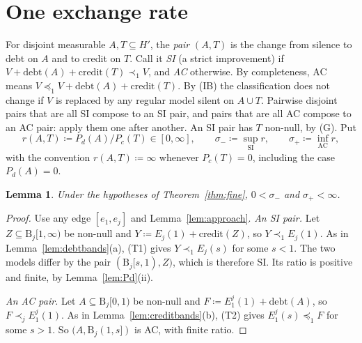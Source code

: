 \documentclass[11pt]{article}
\newtheorem{lemma}[theorem]{Lemma}
\theoremstyle{definition}\newtheorem{definition}[theorem]{Definition}
\theoremstyle{remark}\newtheorem{remark}[theorem]{Remark}
\newcommand{\debt}{\mathrm{debt}}
\newcommand{\cred}{\mathrm{credit}}
\newcommand{\Band}{\mathrm{B}}
\begin{document}
\section{One exchange rate}\label{sec:rate}

For disjoint measurable $A,T\subseteq H'$, the \emph{pair} $(A,T)$ is the
change from silence to debt on $A$ and to credit on $T$. Call it \emph{SI}
(a strict improvement) if $V+\debt(A)+\cred(T)\prec_1V$, and \emph{AC}
otherwise. By completeness, AC means $V\preceq_1V+\debt(A)+\cred(T)$. By
(IB) the classification does not change if $V$ is replaced by any regular
model silent on $A\cup T$. Pairwise disjoint pairs that are all SI compose to
an SI pair, and pairs that are all AC compose to an AC pair: apply them one
after another. An SI pair has $T$ non-null, by (G). Put
\[
 r(A,T)\coloneqq P_d(A)/P_c(T)\in[0,\infty],\qquad
 \sigma_-\coloneqq\sup_{\text{SI}}r,\qquad\sigma_+\coloneqq\inf_{\text{AC}}r,
\]
with the convention $r(A,T)\coloneqq\infty$ whenever $P_c(T)=0$, including
the case $P_d(A)=0$.

\begin{lemma}\label{lem:SIAC}
Under the hypotheses of Theorem~\ref{thm:fine}, $0<\sigma_-$ and
$\sigma_+<\infty$.
\end{lemma}
\begin{proof}
Use any edge $[e_1,e_j]$ and Lemma~\ref{lem:approach}. \emph{An SI pair.} Let
$Z\subseteq\Band_j[1,\infty)$ be non-null and $Y\coloneqq E_j(1)+\cred(Z)$,
so $Y\prec_1E_j(1)$. As in Lemma~\ref{lem:debtbands}(a), (T1) gives
$Y\prec_1E_j(s)$ for some $s<1$. The two models differ by the pair
$(\Band_j[s,1),Z)$, which is therefore SI. Its ratio is positive and finite,
by Lemma~\ref{lem:Pd}(ii).

\emph{An AC pair.} Let $A\subseteq\Band_j[0,1)$ be non-null and
$F\coloneqq E^j_1(1)+\debt(A)$, so $F\prec_jE^j_1(1)$. As in
Lemma~\ref{lem:creditbands}(b), (T2) gives $E^j_1(s)\preceq_1F$ for some
$s>1$. So $(A,\Band_j(1,s])$ is AC, with finite ratio.
\end{proof}
\end{document}
